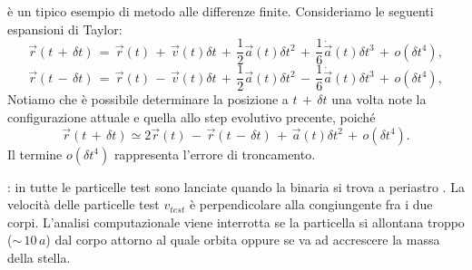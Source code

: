 è un tipico esempio di metodo alle differenze finite. Consideriamo le seguenti espansioni di Taylor:
\begin{equation}
\Vec{r}(t\,+\,\delta t)\,=\,\Vec{r}(t)\,+\,\Vec{v}(t)\delta t\,+\,\frac{1}{2}\Vec{a}(t)\delta t^2\,+\,\frac{1}{6}\dot{\Vec{a}}(t)\delta t^3\,+\,o(\delta t^4),
\label{eq:exp1_verlet}
\end{equation}
\begin{equation}
\Vec{r}(t\,-\,\delta t)\,=\,\Vec{r}(t)\,-\,\Vec{v}(t)\delta t\,+\,\frac{1}{2}\Vec{a}(t)\delta t^2\,-\,\frac{1}{6}\dot{\Vec{a}}(t)\delta t^3\,+\,o(\delta t^4),
\label{eq:exp2_verlet}
\end{equation}
Notiamo che è possibile determinare la posizione a $t\,+\,\delta t$ una volta note la configurazione attuale e quella allo step evolutivo precente, poiché
\begin{equation}
\Vec{r}(t\,+\,\delta t) \simeq 2 \Vec{r}(t)\,-\,\Vec{r}(t\,-\,\delta t)\,+\,\Vec{a}(t)\delta t^2\,+\,o(\delta t^4).
\label{eq:pos_succ}
\end{equation}
Il termine $o(\delta t^4)$ rappresenta l'errore di troncamento.


: in \cite{Pichardo2005} tutte le particelle test sono lanciate quando la binaria si trova a periastro . La velocità delle particelle test $v_{test}$ è perpendicolare alla congiungente fra i due corpi.
L'analisi computazionale viene interrotta se la particella si allontana troppo ($\sim\,10\,a$) dal corpo attorno al quale orbita oppure se va ad accrescere la massa della stella. 





